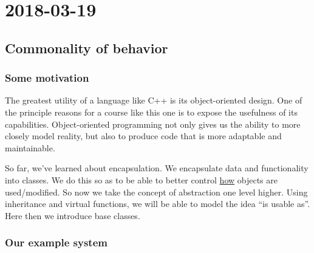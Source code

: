 \section{2018-03-19}

\subsection{Commonality of behavior}

\subsubsection{Some motivation}

The greatest utility of a language like C++ is its object-oriented design. One of the principle reasons for a course like this one is to expose the usefulness of its capabilities. Object-oriented programming not only gives us the ability to more closely model reality, but also to produce code that is more adaptable and maintainable.

So far, we've learned about encapsulation. We encapsulate data and functionality into classes. We do this so as to be able to better control \underline{how} objects are used/modified. So now we take the concept of abstraction one level higher. Using inheritance and virtual functions, we will be able to model the idea ``is usable as''. Here then we introduce base classes.

\subsubsection{Our example system}



